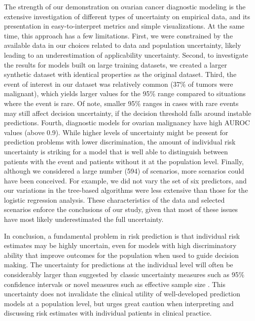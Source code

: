 The strength of our demonstration on ovarian cancer diagnostic modeling is the extensive investigation of different types of uncertainty on empirical data, and its presentation in easy-to-interpret metrics and simple visualizations. At the same time, this approach has a few limitations. First, we were constrained by the available data in our choices related to data and population uncertainty, likely leading to an underestimation of applicability uncertainty. Second, to investigate the results for models built on large training datasets, we created a larger synthetic dataset with identical properties as the original dataset. Third, the event of interest in our dataset was relatively common (37\% of tumors were malignant), which yields larger values for the 95\% range compared to situations where the event is rare. Of note, smaller 95\% ranges in cases with rare events may still affect decision uncertainty, if the decision threshold falls around instable predictions. Fourth, diagnostic models for ovarian malignancy have high \gls{AUROC} values (above 0.9). While higher levels of uncertainty might be present for prediction problems with lower discrimination, the amount of individual risk uncertainty is striking for a model that is well able to distinguish between patients with the event and patients without it at the population level. Finally, although we considered a large number (594) of scenarios, more scenarios could have been conceived. For example, we did not vary the set of six predictors, and our variations in the tree-based algorithms were less extensive than those for the logistic regression analysis. These characteristics of the data and selected scenarios enforce the conclusions of our study, given that most of these issues have most likely underestimated the full uncertainty.

In conclusion, a fundamental problem in risk prediction is that individual risk estimates may be highly uncertain, even for models with high discriminatory ability that improve outcomes for the population when used to guide decision making. The uncertainty for predictions at the individual level will often be considerably larger than suggested by classic uncertainty measures such as 95\% confidence intervals or novel measures such as effective sample size \cite{thomassenEffectiveSampleSize2024}. This uncertainty does not invalidate the clinical utility of well-developed prediction models at a population level, but urges great caution when interpreting and discussing risk estimates with individual patients in clinical practice.



